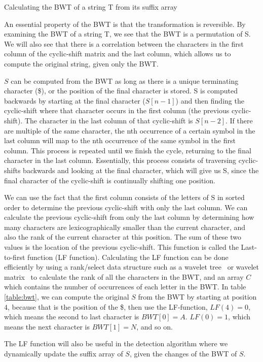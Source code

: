 \begin{algorithm}[htp]
  \SetAlgoLined\DontPrintSemicolon

  \vspace{0.5cm}
  \caption{Calculating the BWT of a string T from its suffix array}
  \label{alg:bwt}
\end{algorithm}


An essential property of the BWT is that the transformation is reversible. By examining
the BWT of a string T, we see that the BWT is a permutation of S. We will also see that
there is a correlation between the characters in the first column of the cyclic-shift
matrix and the last column, which allows us to compute the original string, given only the
BWT.

$S$ can be computed from the BWT as long as there is a unique terminating character (\$),
or the position of the final character is stored. S is computed backwards by starting at
the final character ($S[n - 1]$) and then finding the cyclic-shift where that character
occurs in the first column (the previous cyclic-shift). The character in the last column
of that cyclic-shift is $S[n - 2]$. If there are multiple of the same character, the nth
occurrence of a certain symbol in the last column will map to the nth occurrence of the
same symbol in the first column. This process is repeated until we finish the cycle,
returning to the final character in the last column. Essentially, this process consists of
traversing cyclic-shifts backwards and looking at the final character, which will give us
S, since the final character of the cyclic-shift is continually shifting one position.

We can use the fact that the first column consists of the letters of S in sorted order to
determine the previous cyclic-shift with only the last column. We can calculate the
previous cyclic-shift from only the last column by determining how many characters are
lexicographically smaller than the current character, and also the rank of the current
character at this position. The sum of these two values is the location of the previous
cyclic-shift. This function is called the Last-to-first function (LF function).
Calculating the LF function can be done efficiently by using a rank/select data structure
such as a wavelet tree~\cite{WaveletTree} or wavelet matrix~\cite{WaveletMatrix} to
calculate the rank of all the characters in the BWT, and an array $C$ which contains the
number of occurrences of each letter in the BWT. In table \ref{table:bwt}, we can compute
the original $S$ from the BWT by starting at position $4$, because that is the position of
the \$, then use the LF-function, $LF(4) = 0$, which means the second to last character is
$BWT[0] = A$. $LF(0) = 1$, which means the next character is $BWT[1] = N$, and so on.

The LF function will also be useful in the detection algorithm where we dynamically update
the suffix array of $S$, given the changes of the BWT of $S$.
